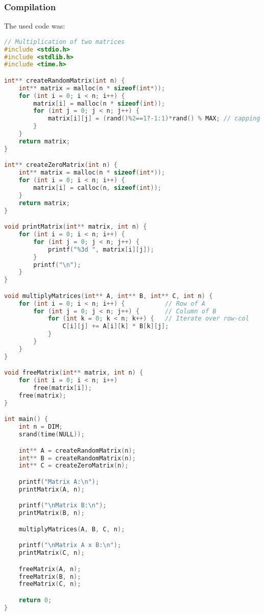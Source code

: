 \subsubsection{Compilation} The used code was:
\begin{lstlisting}[language=C, caption={Row major matrix multiplication algorithm}, label={lst:matrix_mult}]
// Multiplication of two matrices
#include <stdio.h>
#include <stdlib.h>
#include <time.h>

int** createRandomMatrix(int n) {
    int** matrix = malloc(n * sizeof(int*));
    for (int i = 0; i < n; i++) {
        matrix[i] = malloc(n * sizeof(int));
        for (int j = 0; j < n; j++) {
            matrix[i][j] = (rand()%2==1?-1:1)*rand() % MAX; // capping the values
        }
    }
    return matrix;
}

int** createZeroMatrix(int n) {
    int** matrix = malloc(n * sizeof(int*));
    for (int i = 0; i < n; i++) {
        matrix[i] = calloc(n, sizeof(int));
    }
    return matrix;
}

void printMatrix(int** matrix, int n) {
    for (int i = 0; i < n; i++) {
        for (int j = 0; j < n; j++) {
            printf("%3d ", matrix[i][j]);
        }
        printf("\n");
    }
}

void multiplyMatrices(int** A, int** B, int** C, int n) {
    for (int i = 0; i < n; i++) {           // Row of A
        for (int j = 0; j < n; j++) {       // Column of B
            for (int k = 0; k < n; k++) {   // Iterate over row-col
                C[i][j] += A[i][k] * B[k][j];
            }
        }
    }
}

void freeMatrix(int** matrix, int n) {
    for (int i = 0; i < n; i++)
        free(matrix[i]);
    free(matrix);
}

int main() {
    int n = DIM;
    srand(time(NULL)); 

    int** A = createRandomMatrix(n);
    int** B = createRandomMatrix(n);
    int** C = createZeroMatrix(n);

    printf("Matrix A:\n");
    printMatrix(A, n);

    printf("\nMatrix B:\n");
    printMatrix(B, n);

    multiplyMatrices(A, B, C, n);

    printf("\nMatrix A x B:\n");
    printMatrix(C, n);

    freeMatrix(A, n);
    freeMatrix(B, n);
    freeMatrix(C, n);

    return 0;
}

\end{lstlisting}

